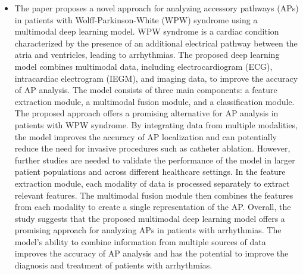 \begin{itemize}
	
	\item The paper proposes a novel approach for analyzing accessory pathways (APs) in patients with Wolff-Parkinson-White (WPW) syndrome using a multimodal deep learning model. WPW syndrome is a cardiac condition characterized by the presence of an additional electrical pathway between the atria and ventricles, leading to arrhythmias. The proposed deep learning model combines multimodal data, including electrocardiogram (ECG), intracardiac electrogram (IEGM), and imaging data, to improve the accuracy of AP analysis. The model consists of three main components: a feature extraction module, a multimodal fusion module, and a classification module. The proposed approach offers a promising alternative for AP analysis in patients with WPW syndrome. By integrating data from multiple modalities, the model improves the accuracy of AP localization and can potentially reduce the need for invasive procedures such as catheter ablation. However, further studies are needed to validate the performance of the model in larger patient populations and across different healthcare settings.  In the feature extraction module, each modality of data is processed separately to extract relevant features. The multimodal fusion module then combines the features from each modality to create a single representation of the AP. Overall, the study suggests that the proposed multimodal deep learning model offers a promising approach for analyzing APs in patients with arrhythmias. The model's ability to combine information from multiple sources of data improves the accuracy of AP analysis and has the potential to improve the diagnosis and treatment of patients with arrhythmias. 
	

\end{itemize}
